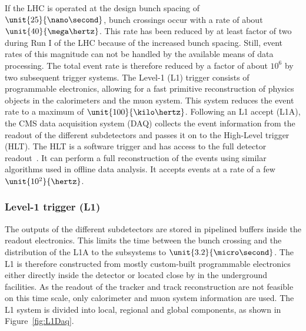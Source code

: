 If the LHC is operated at the design bunch spacing of $\unit{25}{\nano\second}$, bunch crossings occur with a rate of about $\unit{40}{\mega\hertz}$. This rate has been reduced by at least factor of two during Run I of the LHC because of the increased bunch spacing. Still, event rates of this magnitude can not be handled by the available means of data processing. The total event rate is therefore reduced by a factor of about $10^6$ by two subsequent trigger systems. The Level-1 (L1) trigger consists of programmable electronics, allowing for a fast primitive reconstruction of physics objects in the calorimeters and the muon system. This system reduces the event rate to a maximum of $\unit{100}{\kilo\hertz}$. Following an L1 accept (L1A), the CMS data acquisition system (DAQ) collects the event information from the readout of the different subdetectors and passes it on to the High-Level trigger (HLT). The HLT is a software trigger and has access to the full detector readout~\cite{Adam:2005zf}. It can perform a full reconstruction of the events using similar algorithms used in offline data analysis. It accepts events at a rate of a few $\unit{10^2}{\hertz}$.  

\subsubsection*{Level-1 trigger (L1)}
The outputs of the different subdetectors are stored in pipelined buffers inside the readout electronics. This limits the time between the bunch crossing and the distribution of the L1A to the subsystems to $\unit{3.2}{\micro\second}$. The L1 is therefore constructed from mostly custom-built programmable electronics either directly inside the detector or located close by in the underground facilities. As the readout of the tracker and track reconstruction are not feasible on this time scale, only calorimeter and muon system information are used. The L1 system is divided into local, regional and global components, as shown in Figure~\ref{fig:L1Daq}. 

